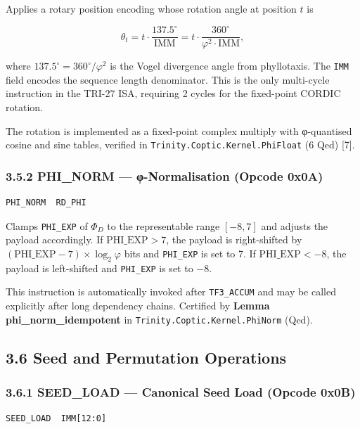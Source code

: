 Applies a rotary position encoding whose rotation angle at
position \(t\) is

\[\theta_t = t \cdot \frac{137.5^\circ}{\text{IMM}} = t \cdot \frac{360^\circ}{\varphi^2 \cdot \text{IMM}},\]

where \(137.5^\circ = 360^\circ/\varphi^2\) is the Vogel
divergence angle from phyllotaxis. The \texttt{IMM} field
encodes the sequence length denominator. This is the only
multi-cycle instruction in the TRI-27 ISA, requiring 2 cycles
for the fixed-point CORDIC rotation.

The rotation is implemented as a fixed-point complex multiply
with φ-quantised cosine and sine tables, verified in
\texttt{Trinity.Coptic.Kernel.PhiFloat} (6 Qed) [7].

\subsubsection{3.5.2 PHI\_NORM --- φ-Normalisation (Opcode 0x0A)}

\begin{verbatim}
PHI_NORM  RD_PHI
\end{verbatim}

Clamps \texttt{PHI\_EXP} of \(\Phi_D\) to the representable
range $[-8, 7]$ and adjusts the payload accordingly. If
\(\text{PHI\_EXP} > 7\), the payload is right-shifted by
\((\text{PHI\_EXP} - 7) \times \log_2\varphi\) bits and
\texttt{PHI\_EXP} is set to 7. If \(\text{PHI\_EXP} < -8\),
the payload is left-shifted and \texttt{PHI\_EXP} is set to $-8$.

This instruction is automatically invoked after
\texttt{TF3\_ACCUM} and may be called explicitly after long
dependency chains. Certified by \textbf{Lemma phi\_norm\_idempotent}
in \texttt{Trinity.Coptic.Kernel.PhiNorm} (Qed).

\subsection{3.6 Seed and Permutation Operations}\label{fa_71:seed-perm}

\subsubsection{3.6.1 SEED\_LOAD --- Canonical Seed Load (Opcode 0x0B)}

\begin{verbatim}
SEED_LOAD  IMM[12:0]
\end{verbatim}

